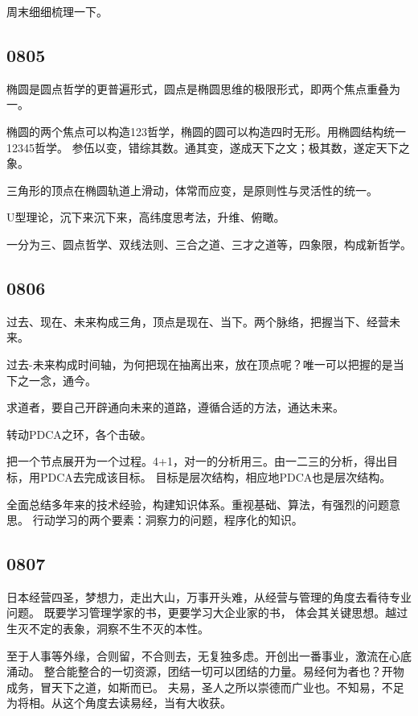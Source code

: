 周末细细梳理一下。

\subsection{0805}

椭圆是圆点哲学的更普遍形式，圆点是椭圆思维的极限形式，即两个焦点重叠为一。

椭圆的两个焦点可以构造123哲学，椭圆的圆可以构造四时无形。用椭圆结构统一12345哲学。
参伍以变，错综其数。通其变，遂成天下之文；极其数，遂定天下之象。

三角形的顶点在椭圆轨道上滑动，体常而应变，是原则性与灵活性的统一。

U型理论，沉下来沉下来，高纬度思考法，升维、俯瞰。

一分为三、圆点哲学、双线法则、三合之道、三才之道等，四象限，构成新哲学。

\subsection{0806}

过去、现在、未来构成三角，顶点是现在、当下。两个脉络，把握当下、经营未来。

过去-未来构成时间轴，为何把现在抽离出来，放在顶点呢？唯一可以把握的是当下之一念，通今。

求道者，要自己开辟通向未来的道路，遵循合适的方法，通达未来。

转动PDCA之环，各个击破。

把一个节点展开为一个过程。4+1，对一的分析用三。由一二三的分析，得出目标，用PDCA去完成该目标。
目标是层次结构，相应地PDCA也是层次结构。

全面总结多年来的技术经验，构建知识体系。重视基础、算法，有强烈的问题意思。
行动学习的两个要素：洞察力的问题，程序化的知识。

\subsection{0807}

日本经营四圣，梦想力，走出大山，万事开头难，从经营与管理的角度去看待专业问题。
既要学习管理学家的书，更要学习大企业家的书，
体会其关键思想。越过生灭不定的表象，洞察不生不灭的本性。

至于人事等外缘，合则留，不合则去，无复独多虑。开创出一番事业，激流在心底涌动。
整合能整合的一切资源，团结一切可以团结的力量。易经何为者也？开物成务，冒天下之道，如斯而已。
夫易，圣人之所以崇德而广业也。不知易，不足为将相。从这个角度去读易经，当有大收获。

